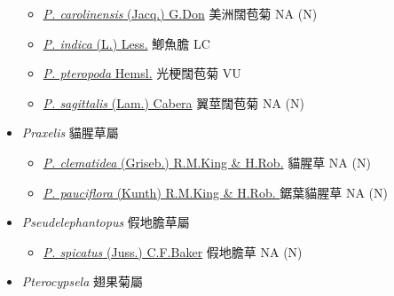\begin{itemize}
  \begin{itemize}
        \item[] \href{http://www.theplantlist.org/tpl1.1/search?q=Pluchea+carolinensis}{\textit{P. carolinensis} (Jacq.) G.Don}   美洲闊苞菊   NA (N)
        \item[] \href{http://www.theplantlist.org/tpl1.1/search?q=Pluchea+indica}{\textit{P. indica} (L.) Less.}   鯽魚膽   LC
        \item[] \href{http://www.theplantlist.org/tpl1.1/search?q=Pluchea+pteropoda}{\textit{P. pteropoda} Hemsl.}   光梗闊苞菊   VU
        \item[] \href{http://www.theplantlist.org/tpl1.1/search?q=Pluchea+sagittalis}{\textit{P. sagittalis} (Lam.) Cabera}   翼莖闊苞菊   NA (N)
  \end{itemize}
 \item[] \textit{Praxelis} 貓腥草屬
                                
  \begin{itemize}
        \item[] \href{http://www.theplantlist.org/tpl1.1/search?q=Praxelis+clematidea}{\textit{P. clematidea} (Griseb.) R.M.King \& H.Rob.}   貓腥草   NA (N)
        \item[] \href{http://www.theplantlist.org/tpl1.1/search?q=Praxelis+pauciflora}{\textit{P. pauciflora} (Kunth) R.M.King \& H.Rob. }   鋸葉貓腥草   NA (N)
  \end{itemize}
 \item[] \textit{Pseudelephantopus} 假地膽草屬
                                
  \begin{itemize}
        \item[] \href{http://www.theplantlist.org/tpl1.1/search?q=Pseudelephantopus+spicatus}{\textit{P. spicatus} (Juss.) C.F.Baker}   假地膽草   NA (N)
  \end{itemize}
 \item[] \textit{Pterocypsela} 翅果菊屬
                                

\end{itemize}
